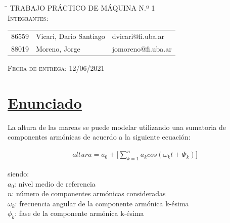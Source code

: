 \documentclass[10pt,a4paper]{article}
\numberwithin{equation}{section}
\numberwithin{figure}{section}
\numberwithin{table}{section}
\begin{document}
\begin{titlepage}
	\vspace*{5mm}

	\begin{large}
			
	\begin{tabbing}
		\hspace{15mm} \= \+	
		\textsc{TRABAJO PRÁCTICO DE MÁQUINA N.º 1}\\
		
         
		\textsc{Integrantes:}\\
	
	
		\begin{tabular}{ l l l }
			
          
			
            
             86559 & Vicari, Dario Santiago		&  dvicari@fi.uba.ar\\
             88019 & Moreno, Jorge              &  jomoreno@fi.uba.ar\\
             

		\end{tabular}
	 
	\end{tabbing}
	
	\end{large}
	
	\hspace{15mm} \textsc{Fecha de entrega:} 12/06/2021  	\hspace{15mm} 
	
\end{titlepage}


\setcounter{page}{1}


\section{\underline{Enunciado}}

La altura de las mareas se puede modelar utilizando una sumatoria de componentes armónicas de acuerdo a la siguiente ecuación:

\begin{equation}\label{eqn:eq_1}
\begin{split}
altura = a_0 + \Big[\sum_{k=1}^{n} a_k  cos(\omega_k t + \Phi_k)\Big] 
\end{split}
\end{equation}


siendo:\\
$a_0$: nivel medio de referencia\\
$n$: número de componentes armónicas consideradas\\
$\omega_k$: frecuencia angular de la componente armónica k-ésima\\
$\phi_k$: fase de la componente armónica k-ésima\\
\end{document}
